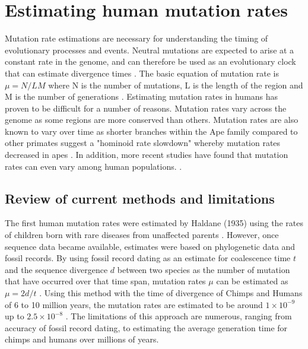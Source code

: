 \documentclass[
11pt, %
oneside, %
english, %
doublespacing, %
headsepline, %
chapterinoneline, %
]{MastersDoctoralThesis} %
\begin{document}
\chapter{Estimating human mutation rates}

Mutation rate estimations are necessary for understanding the timing of evolutionary processes and events.
Neutral mutations are expected to arise at a constant rate in the genome, and can therefore be used as an evolutionary clock that can estimate divergence times \citep{Moorjani2016}. 
The basic equation of mutation rate is $\mu = N / LM$ where N is the number of mutations, L is the length of the region and M is the number of generations \citep{Narasimhan2016}.
Estimating mutation rates in humans has proven to be difficult for a number of reasons.
Mutation rates vary across the genome as some regions are more conserved than others. 
Mutation rates are also known to vary over time as shorter branches within the Ape family compared to other primates suggest a "hominoid rate slowdown" whereby mutation rates decreased in apes \citep{Moorjani2016, Scally2012}.
In addition, more recent studies have found that mutation rates can even vary among human populations. \citep{Harris2015a, Harris2017a}.

\section{Review of current methods and limitations}

The first human mutation rates were estimated by Haldane (1935) using the rates of children born with rare diseases from unaffected parents \citep{Haldane1935}.
However, once sequence data became available, estimates were based on phylogenetic data and fossil records.
By using fossil record dating as an estimate for coalescence time $t$ and the sequence divergence $d$ between two species as the number of mutation that have occurred over that time span, mutation rates $\mu$ can be estimated as $\mu = 2d/t$ \citep{Scally2012}. 
Using this method with the time of divergence of Chimps and Humans of 6 to 10 million years, the mutation rates are estimated to be around $1\times10^{-9}$ up to $2.5\times10^{-8}$ \citep{Takahata1997, Scally2012, Moorjani2016, Narasimhan2016}.
The limitations of this approach are numerous, ranging from accuracy of fossil record dating, to estimating the average generation time for chimps and humans over millions of years.
\end{document}
